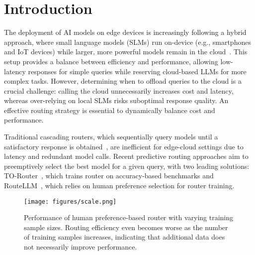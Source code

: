 \section{Introduction}
The deployment of AI models on edge devices is increasingly following a hybrid approach, where small language models (SLMs) run on-device (e.g., smartphones and IoT devices) while larger, more powerful models remain in the cloud~\cite{Gunter2024AppleIF}. This setup provides a balance between efficiency and performance, allowing low-latency responses for simple queries while reserving cloud-based LLMs for more complex tasks. However, determining when to offload queries to the cloud is a crucial challenge: calling the cloud unnecessarily increases cost and latency, whereas over-relying on local SLMs risks suboptimal response quality. An effective routing strategy is essential to dynamically balance cost and performance.


Traditional cascading routers, which sequentially query models until a satisfactory response is obtained~\cite{Chen2023FrugalGPTHT}, are inefficient for edge-cloud settings due to latency and redundant model calls. Recent predictive routing approaches aim to preemptively select the best model for a given query, with two leading solutions: TO-Router~\cite{Stripelis2024TensorOperaRA}, which trains router on accuracy-based benchmarks and RouteLLM~\cite{Ong2024RouteLLMLT}, which relies on human preference selection for router training.


\begin{figure}[t]
  \begin{center}
    \texttt{[image: figures/scale.png]}
  \end{center}
  \vspace{-5mm}
  \caption{Performance of human preference-based router with varying training sample sizes. Routing efficiency even becomes worse as the number of training samples increases, indicating that additional data does not necessarily improve performance.}
  \label{fig:scale_gsm8k}
  \vspace{-4mm}
\end{figure}


